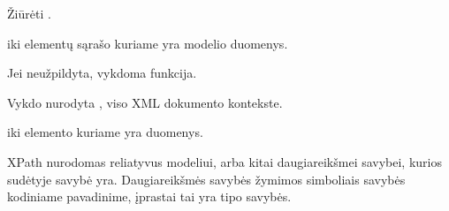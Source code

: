 \documentclass[letterpaper,10pt,lithuanian]{sphinxmanual}
\begin{document}
\begin{fulllineitems}

\pysigstartsignatures
\pysigline
{}
\pysigstopsignatures
\sphinxAtStartPar
Žiūrėti {\hyperref[\detokenize{formules:failai}]{}}.

\end{fulllineitems}



\begin{fulllineitems}

\pysigstartsignatures
\pysigline
{}
\pysigstopsignatures
\sphinxAtStartPar
{} iki elementų sąrašo kuriame
yra modelio duomenys.

\end{fulllineitems}



\begin{fulllineitems}

\pysigstartsignatures
\pysigline
{}
\pysigstopsignatures
\sphinxAtStartPar
Jei neužpildyta, vykdoma  funkcija.

\begin{fulllineitems}
\label{\detokenize{saltiniai:id0}}
\pysigstartsignatures
\pysiglinewithargsret
{}
{}
{}
\pysigstopsignatures
\sphinxAtStartPar
Vykdo nurodyta , viso XML dokumento kontekste.

\end{fulllineitems}


\end{fulllineitems}



\begin{fulllineitems}

\pysigstartsignatures
\pysigline
{}
\pysigstopsignatures
\sphinxAtStartPar
{} iki elemento kuriame yra
duomenys.

\sphinxAtStartPar
XPath nurodomas reliatyvus modeliui, arba kitai daugiareikšmei savybei,
kurios sudėtyje savybė yra. Daugiareikšmės savybės žymimos \sphinxcode{\sphinxupquote{{[}{]}}} simboliais
savybės kodiniame pavadinime, įprastai tai yra  tipo savybės.

\end{fulllineitems}
\end{document}
